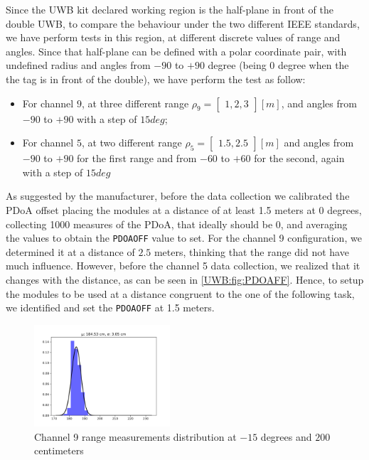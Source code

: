 Since the UWB kit declared working region is the half-plane in front of the double UWB, to compare the behaviour under the two different IEEE standards, we have perform tests in this region, at different discrete values of range and angles. Since that half-plane can be defined with a polar coordinate pair, with undefined radius and angles from $-90$ to $+90$ degree (being $0$ degree when the the tag is in front of the double), we have perform the test as follow:
\begin{itemize}
    \item For channel $9$, at three different range $\rho_9=\begin{bmatrix} 1,2,3 \end{bmatrix} [m]$, and angles from $-90$ to $+ 90$ with a step of $15 deg$;
    \item For channel $5$, at two different range $\rho_5=\begin{bmatrix} 1.5, 2.5 \end{bmatrix} [m]$ and angles from $-90$ to $+90$ for the first range and from $-60$ to $+60$ for the second, again with a step of $15 deg$
\end{itemize}

As suggested by the manufacturer, before the data collection we calibrated the PDoA offset placing the modules at a distance of at least 1.5 meters at 0 degrees, collecting 1000 measures of the PDoA, that ideally should be 0, and averaging the values to obtain the \texttt{PDOAOFF} value to set. For the channel 9 configuration, we determined it at a distance of $2.5$ meters, thinking that the range did not have much influence. However, before the channel 5 data collection, we realized that it changes with the distance, as can be seen in \autoref{UWB:fig:PDOAFF}. Hence, to setup the modules to be used at a distance congruent to the one of the following task, we identified and set the \texttt{PDOAOFF} at 1.5 meters.\\

\begin{figure}
    \centering
    \includegraphics[width=0.45\textwidth]{images/ch9_range_hist.png}
    \caption{Channel 9 range measurements distribution at $-15$ degrees and $200$ centimeters}
    \label{UWB:fig:Range_ch9}
\end{figure}

